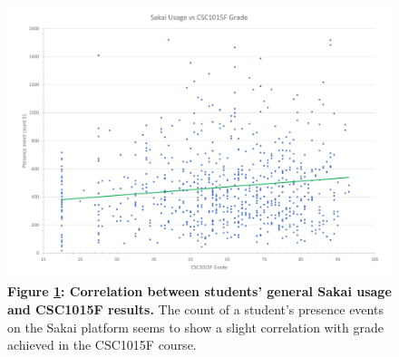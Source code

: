\begin{figure}[H]
    \centering
    \begin{mdframed}
        \centering
        \includegraphics[scale=0.55]{./resources/figures/run3-chart1.png}
    \end{mdframed}
    \caption[CSC1015 grade vs general Sakai usage]{\textbf{Figure \ref{run3-chart1}: Correlation between students' general Sakai usage and CSC1015F results.} The count of a student's presence events on the Sakai platform seems to show a slight correlation with grade achieved in the CSC1015F course.}
    \label{run3-chart1}
\end{figure}

